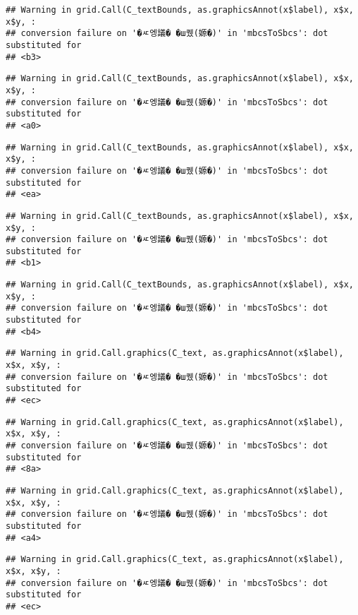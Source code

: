 \documentclass[
]{article}
\begin{document}
\begin{verbatim}
## Warning in grid.Call(C_textBounds, as.graphicsAnnot(x$label), x$x, x$y, :
## conversion failure on '�ㅼ엥議� �ш퀬(嫄�)' in 'mbcsToSbcs': dot substituted for
## <b3>
\end{verbatim}

\begin{verbatim}
## Warning in grid.Call(C_textBounds, as.graphicsAnnot(x$label), x$x, x$y, :
## conversion failure on '�ㅼ엥議� �ш퀬(嫄�)' in 'mbcsToSbcs': dot substituted for
## <a0>
\end{verbatim}

\begin{verbatim}
## Warning in grid.Call(C_textBounds, as.graphicsAnnot(x$label), x$x, x$y, :
## conversion failure on '�ㅼ엥議� �ш퀬(嫄�)' in 'mbcsToSbcs': dot substituted for
## <ea>
\end{verbatim}

\begin{verbatim}
## Warning in grid.Call(C_textBounds, as.graphicsAnnot(x$label), x$x, x$y, :
## conversion failure on '�ㅼ엥議� �ш퀬(嫄�)' in 'mbcsToSbcs': dot substituted for
## <b1>
\end{verbatim}

\begin{verbatim}
## Warning in grid.Call(C_textBounds, as.graphicsAnnot(x$label), x$x, x$y, :
## conversion failure on '�ㅼ엥議� �ш퀬(嫄�)' in 'mbcsToSbcs': dot substituted for
## <b4>
\end{verbatim}

\begin{verbatim}
## Warning in grid.Call.graphics(C_text, as.graphicsAnnot(x$label), x$x, x$y, :
## conversion failure on '�ㅼ엥議� �ш퀬(嫄�)' in 'mbcsToSbcs': dot substituted for
## <ec>
\end{verbatim}

\begin{verbatim}
## Warning in grid.Call.graphics(C_text, as.graphicsAnnot(x$label), x$x, x$y, :
## conversion failure on '�ㅼ엥議� �ш퀬(嫄�)' in 'mbcsToSbcs': dot substituted for
## <8a>
\end{verbatim}

\begin{verbatim}
## Warning in grid.Call.graphics(C_text, as.graphicsAnnot(x$label), x$x, x$y, :
## conversion failure on '�ㅼ엥議� �ш퀬(嫄�)' in 'mbcsToSbcs': dot substituted for
## <a4>
\end{verbatim}

\begin{verbatim}
## Warning in grid.Call.graphics(C_text, as.graphicsAnnot(x$label), x$x, x$y, :
## conversion failure on '�ㅼ엥議� �ш퀬(嫄�)' in 'mbcsToSbcs': dot substituted for
## <ec>
\end{verbatim}
\end{document}
